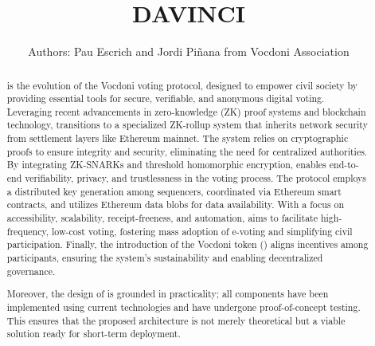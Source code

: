 \documentclass[runningheads, draft]{llncs}
\title{\textsc{DAVINCI}\vspace{-0.4cm}}
\author{Authors: Pau Escrich and Jordi Piñana from Vocdoni Association}
\institute{Last update: \today}
\begin{document}
	
\maketitle

\pagestyle{plain}
\thispagestyle{plain}

\begin{abstract}
		\Davinci is the evolution of the Vocdoni voting protocol, designed to empower civil society by providing essential tools for secure, verifiable, and anonymous digital voting. Leveraging recent advancements in zero-knowledge (ZK) proof systems and blockchain technology, \davinci transitions to a specialized ZK-rollup system that inherits network security from settlement layers like Ethereum mainnet. The system relies on cryptographic proofs to ensure integrity and security, eliminating the need for centralized authorities. By integrating ZK-SNARKs and threshold homomorphic encryption, \davinci enables end-to-end verifiability, privacy, and trustlessness in the voting process. The protocol employs a distributed key generation among sequencers, coordinated via Ethereum smart contracts, and utilizes Ethereum data blobs for data availability. With a focus on accessibility, scalability, receipt-freeness, and automation, \davinci aims to facilitate high-frequency, low-cost voting, fostering mass adoption of e-voting and simplifying civil participation. Finally, the introduction of the Vocdoni token (\token) aligns incentives among participants, ensuring the system's sustainability and enabling decentralized governance.
		
		Moreover, the design of \davinci is grounded in practicality; all components have been implemented using current technologies and have undergone proof-of-concept testing. This ensures that the proposed architecture is not merely theoretical but a viable solution ready for short-term deployment.
		
\end{abstract}


\end{document}
